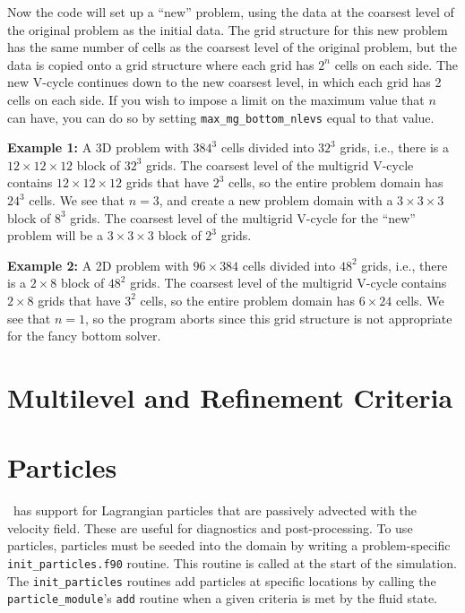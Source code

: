 Now the code will set up a ``new'' problem, using the data at the coarsest level
of the original problem as the initial data.  The grid structure for this new
problem has the same number of cells as the coarsest level of the original problem,
but the data is copied onto a grid structure where each grid has $2^n$ cells
on each side.  The new V-cycle continues down to the new coarsest level, in
which each grid has 2 cells on each side.  If you wish to impose a limit on
the maximum value that $n$ can have, you can do so by setting 
{\tt max\_mg\_bottom\_nlevs} equal to that value.

{\bf Example 1:} A 3D problem with $384^3$ cells divided into $32^3$ grids, i.e., 
there is a $12\times 12\times 12$ block of $32^3$ grids.  The coarsest level of the 
multigrid V-cycle contains $12\times 12\times 12$ grids that have $2^3$ cells, so the 
entire problem domain has $24^3$ cells.  We see that $n=3$, and create a new problem 
domain with a $3\times 3\times 3$ block of $8^3$ grids.  The coarsest level of the 
multigrid V-cycle for the ``new'' problem will be a $3\times 3\times 3$ block of 
$2^3$ grids.

{\bf Example 2:} A 2D problem with $96\times 384$ cells divided into $48^2$ grids, i.e., 
there is a $2\times 8$ block of $48^2$ grids.  The coarsest level of the multigrid 
V-cycle contains $2\times 8$ grids that have $3^2$ cells, so the entire problem 
domain has $6\times 24$ cells.  We see that $n=1$, so the program aborts since this grid
structure is not appropriate for the fancy bottom solver.


\section{Multilevel and Refinement Criteria}


\section{Particles}

\label{arch:sec:particles}

\maestro\ has support for Lagrangian particles that are passively
advected with the velocity field.  These are useful for diagnostics
and post-processing.  To use particles, particles must be seeded into
the domain by writing a problem-specific {\tt init\_particles.f90}
routine.  This routine is called at the start of the simulation.  The
{\tt init\_particles} routines add particles at specific locations by
calling the {\tt particle\_module}'s {\tt add} routine when a given
criteria is met by the fluid state.

